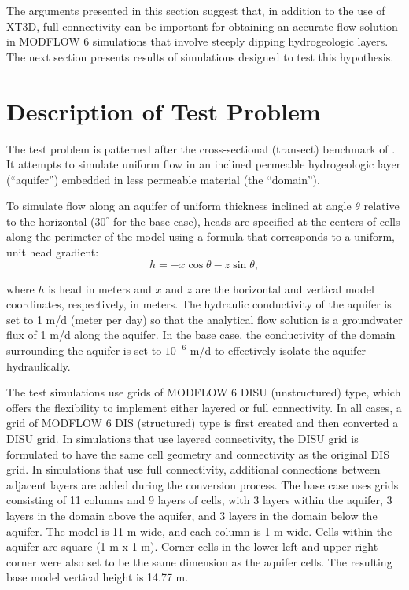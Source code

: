 \documentclass{article}
\begin{document}
The arguments presented in this section suggest that, in addition to the use of XT3D, full connectivity can be important for obtaining an accurate flow solution in MODFLOW 6 simulations that involve steeply dipping hydrogeologic layers. The next section presents results of simulations designed to test this hypothesis.

\section{Description of Test Problem}

The test problem is patterned after the cross-sectional (transect) benchmark of \cite{bardot2022}. It attempts to simulate uniform flow in an inclined permeable hydrogeologic layer (``aquifer'') embedded in less permeable material (the ``domain'').

To simulate flow along an aquifer of uniform thickness inclined at angle $\theta$ relative to the horizontal ($30^{\circ}$ for the base case), heads are specified at the centers of cells along the perimeter of the model using a formula that corresponds to a uniform, unit head gradient:
\begin{equation}
\label{eqn:head_analyt_along}
h = - x \cos \theta - z \sin \theta,
\end{equation}

\noindent where $h$ is head in meters and $x$ and $z$ are the horizontal and vertical model coordinates, respectively, in meters. The hydraulic conductivity of the aquifer is set to 1 m/d (meter per day) so that the analytical flow solution is a groundwater flux of 1 m/d along the aquifer. In the base case, the conductivity of the domain surrounding the aquifer is set to $10^{-6}$ m/d to effectively isolate the aquifer hydraulically.

The test simulations use grids of MODFLOW 6 DISU (unstructured) type, which offers the flexibility to implement either layered or full connectivity. In all cases, a grid of MODFLOW 6 DIS (structured) type is first created and then converted a DISU grid. In simulations that use layered connectivity, the DISU grid is formulated to have the same cell geometry and connectivity as the original DIS grid. In simulations that use full connectivity, additional connections between adjacent layers are added during the conversion process. The base case uses grids consisting of 11 columns and 9 layers of cells, with 3 layers within the aquifer, 3 layers in the domain above the aquifer, and 3 layers in the domain below the aquifer.  The model is 11 m wide, and each column is 1 m wide. Cells within the aquifer are square (1 m x 1 m). Corner cells in the lower left and upper right corner were also set to be the same dimension as the aquifer cells. The resulting base model vertical height is 14.77 m.  
\end{document}
